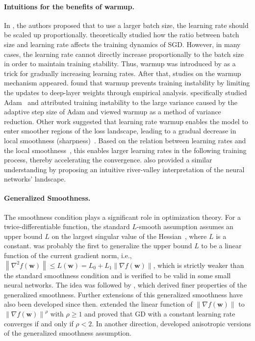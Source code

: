 \documentclass{article}
\newcommand{\Norm}[1]{\left\|#1\right\|}
\newcommand{\bw}{\mathbf{w}}
\begin{document}
\paragraph{Intuitions for the benefits of warmup.}

In \cite{goyal2017accurate}, the authors proposed that to use a larger batch size, the learning rate should be scaled up proportionally. \cite{l.2018dont, jastrzębski2018three} theoretically studied how the ratio between batch size and learning rate affects the training dynamics of SGD. However, in many cases, the learning rate cannot directly increase proportionally to the batch size in order to maintain training stability. Thus, warmup was introduced by \cite{goyal2017accurate} as a trick for gradually increasing learning rates.
After that, studies on the warmup mechanism appeared. \cite{gotmare2018closer} found that warmup prevents training instability by limiting the updates to deep-layer weights through empirical analysis.
\cite{liu2020variance} specifically studied Adam~\citep{kingma2014adam} and attributed training instability to the large variance caused by the adaptive step size of Adam and viewed warmup as a method of variance reduction. 
Other work suggested that learning rate warmup enables the model to enter 
smoother regions of the loss landscape, leading to a gradual decrease in local smoothness (sharpness)~\citep{gilmer2022loss, kalra2024warmup}. Based on the relation between learning rates and the local smoothness~\citep{nesterov2018lectures,cohen2021gradient}, this enables larger learning rates in the following training process, thereby accelerating the convergence. \cite{wen2024understanding} also provided a similar understanding by proposing an intuitive river-valley interpretation of the neural networks' landscape.



\paragraph{Generalized Smoothness.} The smoothness condition plays a significant role in optimization theory. 
For a twice-differentiable function, the standard $L$-smooth assumption assumes an upper bound $L$ on the largest singular value of the Hessian~\citep{nesterov2018lectures}, where $L$ is a constant.
\cite{zhang2020gradient} was probably the first to generalize the upper bound $L$ to be a linear function of the current gradient norm, i.e., $\Norm{\nabla^2 f(\bw)} \le L(\bw) = L_0 + L_1 \Norm{\nabla f(\bw)}$, which is strictly weaker than the standard smoothness condition and is verified to be valid in some small neural networks. The idea was followed by \cite{zhang2020improved}, which derived finer properties of the generalized smoothness. Further extensions of this generalized smoothness have also been developed since then. \cite{li2023convex} extended the linear function of $\Norm{\nabla f(\bw)}$ to $\Norm{\nabla f(\bw)}^\rho$ with $\rho \ge 1$ and proved that GD {with a constant learning rate} converges if and only if $\rho < 2$. In another direction, \cite{crawshaw2022robustness,liu2024adagrad} developed anisotropic versions of the generalized smoothness assumption.
\end{document}

